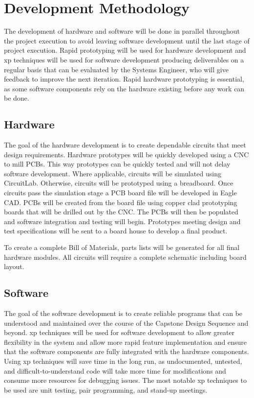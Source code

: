 \chapter{Development Methodology}
The development of hardware and software will be done in parallel throughout the project execution to avoid leaving software development until the last stage of project execution. 
Rapid prototyping will be used for hardware development and \gls{xp} techniques will be used for software development producing deliverables on a regular basis that can be evaluated by the Systems Engineer, who will give feedback to improve the next iteration. 
Rapid hardware prototyping is essential, as some software components rely on the hardware existing before any work can be done.
\section{Hardware}
The goal of the hardware development is to create dependable circuits that meet design requirements.
Hardware prototypes will be quickly developed using a CNC to mill PCBs.
This way prototypes can be quickly tested and will not delay software development.
Where applicable, circuits will be simulated using CircuitLab.
Otherwise, circuits will be prototyped using a breadboard.
Once circuits pass the simulation stage a PCB board file will be developed in Eagle CAD.
PCBs will be created from the board file using copper clad prototyping boards that will be drilled out by the CNC.
The PCBs will then be populated and software integration and testing will begin.
Prototypes meeting design and test specifications will be sent to a board house to develop a final product.

To create a complete Bill of Materials, parts lists will be generated for all final hardware modules.
All circuits will require a complete schematic including board layout. 

\section{Software}
The goal of the software development is to create reliable programs that can be understood and maintained over the course of the Capstone Design Sequence and beyond.
\gls{xp} techniques will be used for software development to allow greater flexibility in the system and allow more rapid feature implementation and ensure that the software components are fully integrated with the hardware components. 
Using \gls{xp} techniques will save time in the long run, as undocumented, untested, and difficult-to-understand code will take more time for modifications and consume more resources for debugging issues.
The most notable \gls{xp} techniques to be used are unit testing, pair programming, and stand-up meetings.

